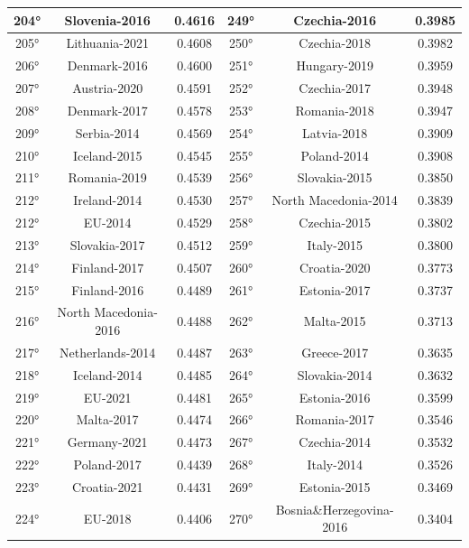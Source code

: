\documentclass[a4paper,12pt, openright]{report}
\begin{document}
\begin{longtable}[c]{|c|c|c|c|c|c|}
    \hline
    204° &  Slovenia-2016 & 0.4616 &  249° &  Czechia-2016 &  0.3985\\
    \hline
    205° &  Lithuania-2021 & 0.4608 &  250° &  Czechia-2018 &  0.3982\\
    \hline
    206° &  Denmark-2016  & 0.4600 & 251° & Hungary-2019 &  0.3959\\
    \hline
    207° & Austria-2020 & 0.4591 & 252° & Czechia-2017 &   0.3948 \\
    \hline
    208° &  Denmark-2017 & 0.4578 & 253° &  Romania-2018 & 0.3947 \\
    \hline
    209° &  Serbia-2014 & 0.4569 & 254° & Latvia-2018 &  0.3909\\
    \hline
    210° &  Iceland-2015 & 0.4545 &  255° &  Poland-2014 &  0.3908 \\
    \hline
    211° &  Romania-2019 & 0.4539 &  256° &  Slovakia-2015 & 0.3850 \\
    \hline
    212° &  Ireland-2014 & 0.4530 & 257° &  North Macedonia-2014 &  0.3839 \\
    \hline
    212° &  EU-2014 & 0.4529 & 258° &  Czechia-2015 &  0.3802 \\ 
    \hline
    213° &  Slovakia-2017 & 0.4512 & 259° &  Italy-2015 &  0.3800 \\ 
    \hline
    214° &  Finland-2017 & 0.4507 & 260° &  Croatia-2020 &  0.3773 \\ 
    \hline
    215° &  Finland-2016 & 0.4489 & 261° &  Estonia-2017 &  0.3737\\ 
    \hline
    216° & North Macedonia-2016 & 0.4488 & 262° &  Malta-2015 & 0.3713 \\ 
    \hline
    217° &  Netherlands-2014 & 0.4487 & 263° &  Greece-2017 &  0.3635 \\ 
    \hline
    218° & Iceland-2014 & 0.4485 &  264° &  Slovakia-2014 & 0.3632 \\ 
    \hline
    219° &  EU-2021 & 0.4481 & 265° &  Estonia-2016 &  0.3599 \\ 
    \hline
    220° &  Malta-2017 & 0.4474 & 266° &  Romania-2017 &  0.3546\\
    \hline
    221° &  Germany-2021 & 0.4473 & 267° &  Czechia-2014 & 0.3532 \\ 
    \hline
    222° &  Poland-2017 & 0.4439 &  268° &  Italy-2014 & 0.3526 \\ 
    \hline
    223° &  Croatia-2021 & 0.4431 & 269° &  Estonia-2015 & 0.3469 \\ 
    \hline
    224° & EU-2018 & 0.4406 & 270° &  Bosnia\&Herzegovina-2016 & 0.3404 \\ 

\end{longtable}
\end{document}
